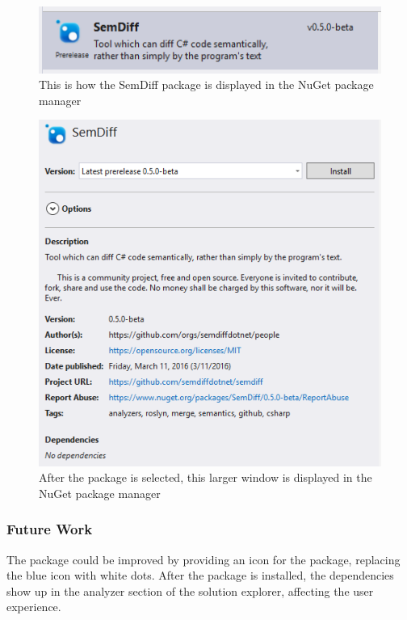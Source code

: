 \documentclass[draftclsnofoot,onecolumn]{IEEEtran}
\begin{document}
\begin{figure}[!t]
\centering
\includegraphics[width=\textwidth]{SemDiffInPackageManagerSmall}
\caption{This is how the SemDiff package is displayed in the NuGet package 
manager}
\label{pacmansmall}
\end{figure}

\begin{figure}[!t]
\centering
\includegraphics[width=\textwidth]{SemDiffInPackageManager}
\caption{After the package is selected, this larger window is displayed in the 
NuGet package manager}
\label{pacman}
\end{figure}

\subsubsection{Future Work}

The package could be improved by providing an icon for the package, replacing 
the blue icon with white dots. After the package is installed, the 
dependencies show up in the analyzer section of the solution explorer, 
affecting the user experience.
\end{document}
